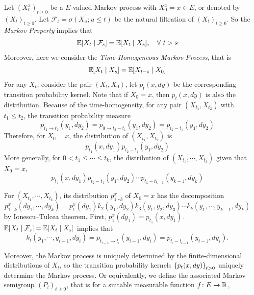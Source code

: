 \begin{enumerate}[label=\arabic{*}.]
	\noindent Let $(X_t^x)_{t \geq 0}$ be a $E$-valued Markov process with $X^x_0 = x \in E$, or denoted by $(X_t)_{t \geq 0}$. Let $\mathcal{F}_t = \sigma(X_u;u\leq t)$ be the natural filtration of $(X_t)_{t \geq 0}$. So the \emph{Markov Property} implies that
	\begin{equation*}
	    \mathbb{E}[X_t \mid \mathcal{F}_s] = \mathbb{E}[X_t \mid X_s],\quad \forall~t > s
	\end{equation*}
	Moreover, here we consider the \emph{Time-Homogeneous Markov Process}, that is
	\begin{equation*}
	    \mathbb{E}[X_t \mid X_s] = \mathbb{E}[X_{t-s} \mid X_0]
	\end{equation*}
	For any $X_t$, consider the pair $(X_t,X_0)$, let $p_t(x,dy)$ be the corresponding transition probability kernel. Note that if $X_0=x$, then $p_t(x,dy)$ is also the distribution. Because of the time-homogeneity, for any pair $(X_{t_1},X_{t_2})$ with $t_1 \leq t_2$, the transition probability measure 
	\begin{equation*}
	    p_{t_1 \rightarrow t_2}(y_1,dy_2) = p_{0 \rightarrow t_2-t_1}(y_1,dy_2) = p_{t_2-t_1}(y_1,dy_2)
	\end{equation*}
	Therefore, for $X_0 = x$, the distribution of $(X_{t_1},X_{t_2})$ is
	\begin{equation*}
	    p_{t_1}(x,dy_1)p_{t_2-t_1}(y_1,dy_2)
	\end{equation*}
	More generally, for $0 < t_1\leq \cdots \leq t_k$, the distribution of $(X_{t_1},\cdots,X_{t_k})$ given that $X_0 = x$,
	\begin{equation*}
	    p_{t_1}(x,dy_1)p_{t_2-t_1}(y_1,dy_2)\cdots p_{t_k-t_{k-1}}(y_{k-1},dy_k)
	\end{equation*}
	\begin{rmk}
	    For $(X_{t_1},\cdots,X_{t_k})$, its distribution $p^x_{1\cdots k}$ of $X_0 = x$ has the decomposition
	    \begin{equation*}
	    	p^x_{1\cdots k}(dy_1,\cdots,dy_k) = p^x_1(dy_1)k_2(y_1,dy_2)k_3(y_1,y_2,dy_3)\cdots k_k(y_1,\cdots,y_{k-1},dy_k)
	    \end{equation*}
	    by Ionescu–Tulcea theorem. First, $p^x_1(dy_1) = p_{t_1}(x,dy_1)$. $\mathbb{E}[X_t \mid \mathcal{F}_s] = \mathbb{E}[X_t \mid X_s]$ implies that
	    \begin{equation*}
	    	k_i(y_1,\cdots,y_{i-1},dy_i) = p_{t_{i-1} \rightarrow t_i}(y_{i-1},dy_i) = p_{t_i-t_{i-1}}(y_{i-1},dy_i).
	    \end{equation*}
	\end{rmk}
	Moreover, the Markov process is uniquely determined by the finite-dimensional distributions of $X_t$, so the transition probability kernels $\left\{p_t(x,dy)\right\}_{t > 0}$ uniquely determine the Markov process. Or equivalently, we define the associated Markov semigroup $(P_t)_{t \geq 0}$, that is for a suitable measurable function $f \colon E \rightarrow \mathbb{R}$,

\end{enumerate}
